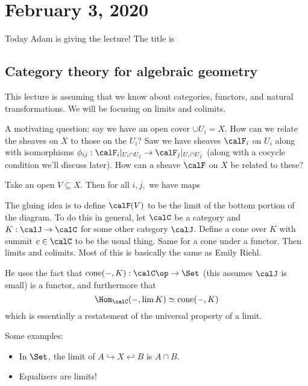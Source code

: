 \documentclass[12pt]{article}
\begin{document}
\section{February 3, 2020}
Today Adam is giving the lecture! The title is 

\subsection{Category theory for algebraic geometry}
This lecture is assuming that we know about categories, functors, and natural transformations.
We will be focusing on limits and colimits.

A motivating question: say we have an open cover $\cup U_i=X$. How can we relate the sheaves on $X$ to those on the $U_i$? Saw we have sheaves $\calF_i$ on $U_i$ along with 
isomorphisms $\phi_{ij}:\calF_i|_{U_i\cap U_j}\to \calF_j|_{U_i\cap U_j}$ (along with a cocycle condition we'll discuss later). How can a sheave $\calF$ on $X$ 
be related to these?

Take an open $V\subseteq X$. Then for all $i,j,$ we have maps
\begin{figure}[h]
	\centering
\end{figure}

The gluing idea is to define $\calF(V)$ to be the limit of the bottom portion of the diagram. To do this in general,
let $\calC$ be a category and $K:\calJ\to\calC$ for some other category $\calJ$. Define a cone over $K$ with summit $c\in \calC$ 
to be the usual thing. Same for a cone under a functor. Then limits and colimits. Most of this is 
basically the same as Emily Riehl.

He uses the fact that $\operatorname{cone}(-,K):\calC\op\to\Set$ (this assumes $\calJ$ is small) is a functor,
and furthermore that 
\[\Hom_\calC(-,\lim K)\simeq \operatorname{cone}(-,K)\]
which is essentially a restatement of the universal property of a limit.

Some examples:
\begin{itemize}
	\item In $\Set$, the limit of $A\hookrightarrow X\hookleftarrow B$ is $A\cap B$.
	\item Equalizers are limits!
\end{itemize}
\end{document}
